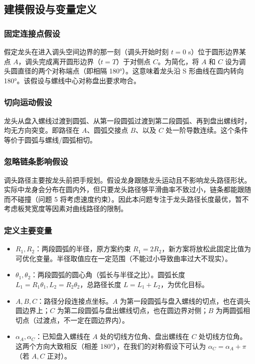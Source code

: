 \documentclass[UTF8]{ctexart}
\begin{document}
\subsection{建模假设与变量定义}

\subsubsection{固定连接点假设}
假定龙头在进入调头空间边界的那一刻（调头开始时刻 $t=0$ s）位于圆形边界某点 $A$，调头完成离开圆形边界（$t=T$）于对侧点 $C$。为简化，将 $A$ 和 $C$ 设为调头圆直径的两个对称端点（即相隔 180°）。这意味着龙头沿 S 形曲线在圆内转向 180°。该假设与螺线中心对称盘出要求吻合。

\subsubsection{切向运动假设}
龙头从盘入螺线过渡到圆弧、从第一段圆弧过渡到第二段圆弧、再到盘出螺线时，均无方向突变。即路径在 $A$、圆弧交接点 $B$、以及 $C$ 处一阶导数连续。这个条件等价于圆弧与螺线/圆弧相切。

\subsubsection{忽略链条影响假设}
调头路径主要按龙头前把手规划。假设龙身跟随龙头运动且不影响龙头路径形状。实际中龙身会分布在圆内外，但只要龙头路径够平滑曲率不致过小，链条都能跟随而不碰撞（问题 5 将考虑速度约束）。因此本问题专注于龙头路径长度最优，暂不考虑板凳宽度等因素对曲线路径的限制。

\subsubsection{定义主要变量}
\begin{itemize}
    \item $R_1, R_2$：两段圆弧的半径，原方案约束 $R_1=2R_2$，新方案将放松此固定比值为可优化变量。半径取值应在一定范围（不能过小导致曲率过大不现实）。
    \item $\theta_1, \theta_2$：两段圆弧的圆心角（弧长与半径之比）。圆弧长度 $L_1=R_1\theta_1, L_2=R_2\theta_2$，总路径长度 $L = L_1+L_2$，为优化目标。
    \item $A, B, C$：路径分段连接点坐标。$A$ 为第一段圆弧与盘入螺线的切点，也在调头圆边界上；$C$ 为第二段圆弧与盘出螺线切点，也在圆边界对侧；$B$ 为两圆弧相切点（过渡点，不一定在圆边界内）。
    \item $\alpha_A, \alpha_C$：已知盘入螺线在 $A$ 处的切线方位角、盘出螺线在 $C$ 处切线方位角。这两个方向大致相反（相差 180°），在我们的对称假设下可认为 $\alpha_C = \alpha_A + \pi$（若 $A,C$ 正对）。
\end{itemize}
\end{document}
